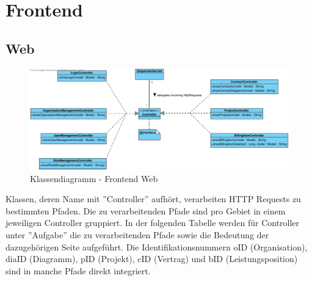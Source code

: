 
\section{Frontend}

\subsection{Web}

\begin{figure}[h]
	\centering
	\includegraphics[width=\linewidth]{img/diagrams/Frontend Classes.pdf}
	\caption{Klassendiagramm - Frontend Web}
	\label{fig:klassendiagramm-web}
\end{figure}

\noindent
Klassen, deren Name mit ''Controller'' aufhört, verarbeiten HTTP Requests zu bestimmten Pfaden.
Die zu verarbeitenden Pfade sind pro Gebiet in einem jeweiligen Controller gruppiert.
In der folgenden Tabelle werden für Controller unter ''Aufgabe'' die zu verarbeitenden Pfade sowie die Bedeutung der dazugehörigen Seite aufgeführt.
Die Identifikationsnummern oID (Organisation), diaID (Diagramm), pID (Projekt), cID (Vertrag) und bID (Leistungsposition) sind in manche Pfade direkt integriert. \\

